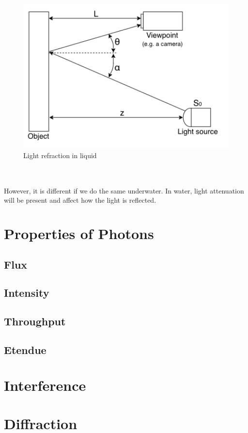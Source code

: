 \begin{figure}[H]
\centering
  \includegraphics[width=12cm]{Images/theory/reflectance.png}
  \caption{Light refraction in liquid}
  \label{fig:reflectance}
\end{figure}
\\\\
However, it is different if we do the same underwater. In water, light attenuation will be present and affect how the light is reflected.
\vspace{1.3cm}
\section{Properties of Photons}
\subsection{Flux}
\subsection{Intensity}
\subsection{Throughput}
\subsection{Etendue}

\vspace{1.3cm}
\section{Interference}
\vspace{1.3cm}
\section{Diffraction}


